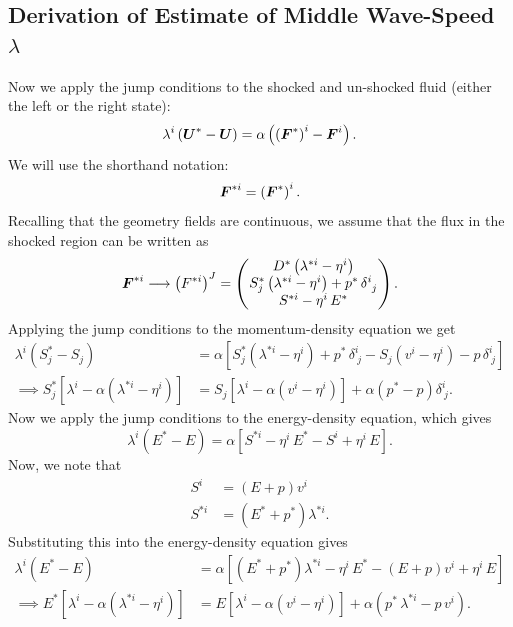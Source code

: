 \documentclass[10pt,preprint]{../aastex}
\begin{document}
\subsection{Derivation of Estimate of Middle Wave-Speed $\lambda$}
Now we apply the jump conditions to the shocked and un-shocked fluid (either the left or the right state):
\begin{equation}
\lambda^{i}\left(\boldsymbol{U}^{*}-\boldsymbol{U}\right)=\alpha\left(\left(\boldsymbol{F}^{*}\right)^{i}-\boldsymbol{F}^{i}\right).
\end{equation}
We will use the shorthand notation:
\begin{equation}
\boldsymbol{F}^{*i}=\left(\boldsymbol{F}^{*}\right)^{i}.
\end{equation}
Recalling that the geometry fields are continuous, we assume that the flux in the shocked region can be written as
\begin{equation}
\boldsymbol{F}^{*i}\longrightarrow\left(F^{*i}\right)^{J}=\begin{pmatrix}D^{*}\left(\lambda^{*i}-\eta^{i}\right)\\ S^{*}_{j}\left(\lambda^{*i}-\eta^{i}\right)+p^{*}\,\delta^{i}_{~j}\\S^{*i}-\eta^{i}\,E^{*}\end{pmatrix}.
\end{equation}
Applying the jump conditions to the momentum-density equation we get
\begin{align}
\lambda^{i}\left(S_{j}^{*}-S_{j}\right)&=\alpha\left[S^{*}_{j}\left(\lambda^{*i}-\eta^{i}\right)+p^{*}\,\delta^{i}_{~j}-S_{j}\left(v^{i}-\eta^{i}\right)-p\,\delta^{i}_{~j}\right]\\
\implies S^{*}_{j}\left[\lambda^{i}-\alpha\left(\lambda^{*i}-\eta^{i}\right)\right]&=S_{j}\left[\lambda^{i}-\alpha\left(v^{i}-\eta^{i}\right)\right]+\alpha\left(p^{*}-p\right)\delta^{i}_{~j}.
\end{align}
Now we apply the jump conditions to the energy-density equation, which gives
\begin{equation}
\lambda^{i}\left(E^{*}-E\right)=\alpha\left[S^{*i}-\eta^{i}\,E^{*}-S^{i}+\eta^{i}\,E\right].
\end{equation}
Now, we note that
\begin{align}
S^{i}&=\left(E+p\right)v^{i}\label{Eq:Mom-En}\\
S^{*i}&=\left(E^{*}+p^{*}\right)\lambda^{*i}.
\end{align}
Substituting this into the energy-density equation gives
\begin{align}
\lambda^{i}\left(E^{*}-E\right)&=\alpha\left[\left(E^{*}+p^{*}\right)\lambda^{*i}-\eta^{i}\,E^{*}-\left(E+p\right)v^{i}+\eta^{i}\,E\right]\\
\implies E^{*}\left[\lambda^{i}-\alpha\left(\lambda^{*i}-\eta^{i}\right)\right]&=E\left[\lambda^{i}-\alpha\left(v^{i}-\eta^{i}\right)\right]+\alpha\left(p^{*}\,\lambda^{*i}-p\,v^{i}\right).\label{Eq:En1}
\end{align}
\end{document}
